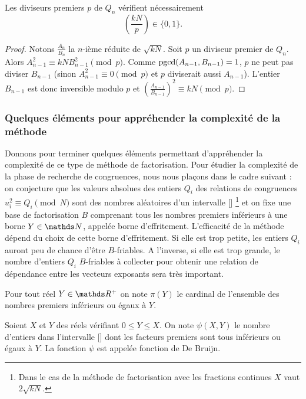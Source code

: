 \begin{proposition}
	Les diviseurs premiers $p$ de $Q_n$ vérifient nécessairement
	\[\left(\frac{kN}{p} \right) \in \{0, 1\}.\]
\end{proposition}

\begin{proof}
    Notons $\frac{A_n}{B_n}$ la $n$-ième réduite de $\sqrt{kN}$. 
    Soit $p$ un diviseur premier de $Q_n$. Alors $ A_{n-1}^2 \equiv kNB_{n-1}^2
	\pmod{p}$. Comme $\operatorname{pgcd}(A_{n-1},B_{n-1}) = 1$, $p$ ne peut pas diviser
	$B_{n-1}$ (sinon $A_{n-1}^2 \equiv 0 \pmod{p}$ et $p$ diviserait aussi
	$A_{n-1}$). L'entier $B_{n-1}$ est donc inversible modulo $p$ et $\left(
	\frac{A_{n-1}}{B_{n-1}}\right )^2 \equiv kN \pmod{p}$.
\end{proof}

\subsubsection{Quelques éléments pour appréhender la complexité de la méthode}


Donnons pour terminer quelques éléments permettant d'appréhender la complexité 
de ce type de méthode de factorisation.  Pour étudier la complexité de la phase 
de recherche de congruences, nous nous plaçons dans le cadre suivant : on 
conjecture que les valeurs absolues des entiers $Q_i$ 
des relations de congruences $u_i^2 \equiv Q_i \pmod{N}$ sont des nombres 
aléatoires d'un intervalle [\![1, X]\!] \footnote{Dans le cas de la méthode de 
factorisation avec les fractions continues $X$ vaut $2\sqrt{kN}$. } et on fixe 
une base de factorisation $B$ comprenant tous les nombres premiers inférieurs à une 
borne $Y \in \N$, appelée borne d'effritement. L'efficacité de la méthode dépend du
choix de cette borne d'effritement. Si elle est trop petite, les entiers $Q_i$
auront peu de chance d'être $B$-friables. A l'inverse, si elle est trop grande,
le nombre d'entiers $Q_i$ $B$-friables à collecter pour obtenir une relation de 
dépendance entre les vecteurs exposants sera très important.
\begin{notation}
    Pour tout réel $Y \in \R^+$ on note $\pi(Y)$ le cardinal de l'ensemble des
    nombres premiers inférieurs ou égaux à $Y$.
\end{notation}
\begin{notation}
    Soient $X$ et $Y$ des réels vérifiant $0 \leq Y \leq X$. On note $\psi(X,Y)$
    le nombre d'entiers dans l'intervalle [\![1, X]\!]  dont les facteurs premiers  
    sont tous inférieurs ou égaux à $Y$. La fonction $\psi$ est appelée fonction 
    de De Bruijn.
\end{notation}

